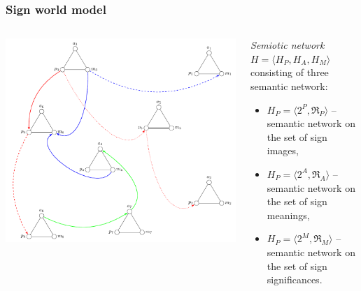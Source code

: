 \documentclass[default]{beamer}
\begin{document}
	\begin{frame}
		\frametitle{Sign world model}
		
		\begin{columns}
			\begin{column}{0.55\textwidth}
				\includegraphics[width=\textwidth]{signs/signs_net}
			\end{column}
			\begin{column}{0.45\textwidth}
				\textit{Semiotic network} $H=\langle H_P, H_A, H_M\rangle$ consisting of three semantic network: 
				\begin{itemize}
					\item $H_P=\langle2^P,\mathfrak R_P\rangle$ -- semantic network on the set of sign images,
					\item $H_P=\langle2^A,\mathfrak R_A\rangle$ -- semantic network on the set of sign meanings,
					\item $H_P=\langle2^M,\mathfrak R_M\rangle$ -- semantic network on the set of sign significances.
				\end{itemize}
				\nocite{*}
				\printbibliography[keyword={osipov}, resetnumbers=true]
			\end{column}
		\end{columns}
	\end{frame}				
\end{document}

